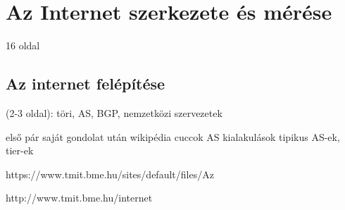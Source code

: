 \chapter{Az Internet szerkezete és mérése}
16 oldal




\section{Az internet felépítése}
(2-3 oldal): töri, AS, BGP, nemzetközi szervezetek

első pár saját gondolat után wikipédia cuccok
AS kialakulások
tipikus AS-ek, tier-ek

https://www.tmit.bme.hu/sites/default/files/Az%

http://www.tmit.bme.hu/internet